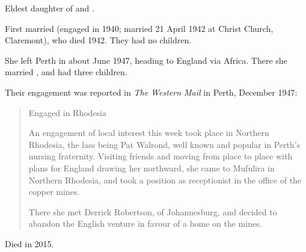 
Eldest daughter of  and .\cite{MartinWalmondMarriage}

First married 
(engaged in 1940\cite{MartinWalmondEngagement}; married 21 April 1942 at Christ Church, Claremont\cite{MartinWalmondMarriage}),
who died 1942.
They had no children.

She left Perth in about June 1947, heading to England via Africa.\cite{PatWalrondWesternMail}
There she married , and had three children.

Their engagement was reported in \emph{The Western Mail} in Perth, December 1947:\cite{PatWalrondWesternMail}
\begin{quotation}
Engaged in Rhodesia

An engagement of local interest this week took place in Northern Rhodesia, the lass being Pat Walrond,
well known and popular in Perth's nursing fraternity.
Visiting friends and moving from place to place with plans for England drawing her northward,
she came to Mufulira in Northern Rhodesia,
and took a position as receptionist in the office of the copper mines.

There she met Derrick Robertson, of Johannesburg, and decided to abandon the English venture in favour of a home on the mines.
\end{quotation}

Died in 2015.
